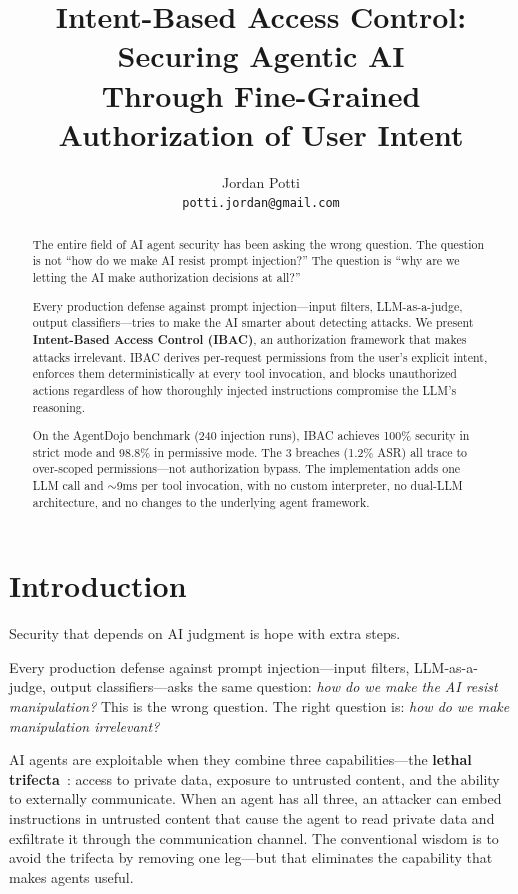 \documentclass[11pt]{article}
\title{\textbf{Intent-Based Access Control: Securing Agentic AI\\Through Fine-Grained Authorization of User Intent}}
\author{
  Jordan Potti \\
  \texttt{potti.jordan@gmail.com}
}
\date{}
\begin{document}
\maketitle

\begin{abstract}
The entire field of AI agent security has been asking the wrong question. The question is not ``how do we make AI resist prompt injection?'' The question is ``why are we letting the AI make authorization decisions at all?''

Every production defense against prompt injection---input filters, LLM-as-a-judge, output classifiers---tries to make the AI smarter about detecting attacks. We present \textbf{Intent-Based Access Control (IBAC)}, an authorization framework that makes attacks irrelevant. IBAC derives per-request permissions from the user's explicit intent, enforces them deterministically at every tool invocation, and blocks unauthorized actions regardless of how thoroughly injected instructions compromise the LLM's reasoning.

On the AgentDojo benchmark (240 injection runs), IBAC achieves 100\% security in strict mode and 98.8\% in permissive mode. The 3 breaches (1.2\% ASR) all trace to over-scoped permissions---not authorization bypass. The implementation adds one LLM call and ${\sim}$9ms per tool invocation, with no custom interpreter, no dual-LLM architecture, and no changes to the underlying agent framework.
\end{abstract}

\section{Introduction}

Security that depends on AI judgment is hope with extra steps.

Every production defense against prompt injection---input filters, LLM-as-a-judge, output classifiers---asks the same question: \textit{how do we make the AI resist manipulation?} This is the wrong question. The right question is: \textit{how do we make manipulation irrelevant?}

AI agents are exploitable when they combine three capabilities---the \textbf{lethal trifecta}~\cite{willison2023dual,willison2025trifecta}: access to private data, exposure to untrusted content, and the ability to externally communicate. When an agent has all three, an attacker can embed instructions in untrusted content that cause the agent to read private data and exfiltrate it through the communication channel. The conventional wisdom is to avoid the trifecta by removing one leg---but that eliminates the capability that makes agents useful.
\end{document}
